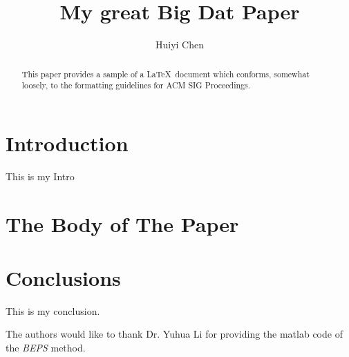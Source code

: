 \documentclass[sigconf]{acmart}
\begin{document}
\title{My great Big Dat Paper}


\author{Huiyi Chen}



\renewcommand{\shortauthors}{B. Trovato et al.}


\begin{abstract}
This paper provides a sample of a \LaTeX\ document which conforms,
somewhat loosely, to the formatting guidelines for
ACM SIG Proceedings.
\end{abstract}



\maketitle

\section{Introduction}

This is my Intro


\section{The Body of The Paper}


\section{Conclusions}

This is my conclusion.



\begin{acks}

  The authors would like to thank Dr. Yuhua Li for providing the
  matlab code of the \textit{BEPS} method.

 
\end{acks}


 
\end{document}
